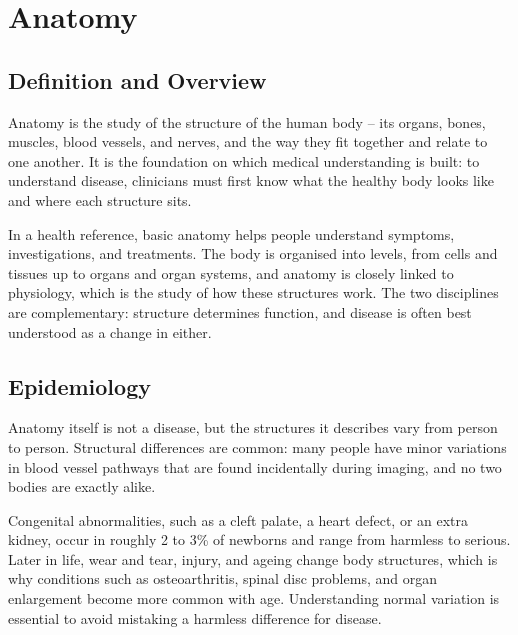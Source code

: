 \chapter{Anatomy}

\section*{Definition and Overview}
Anatomy is the study of the structure of the human body -- its organs, bones, muscles, blood vessels, and nerves, and the way they fit together and relate to one another. It is the foundation on which medical understanding is built: to understand disease, clinicians must first know what the healthy body looks like and where each structure sits.

In a health reference, basic anatomy helps people understand symptoms, investigations, and treatments. The body is organised into levels, from cells and tissues up to organs and organ systems, and anatomy is closely linked to physiology, which is the study of how these structures work. The two disciplines are complementary: structure determines function, and disease is often best understood as a change in either.

\section*{Epidemiology}
Anatomy itself is not a disease, but the structures it describes vary from person to person. Structural differences are common: many people have minor variations in blood vessel pathways that are found incidentally during imaging, and no two bodies are exactly alike.

Congenital abnormalities, such as a cleft palate, a heart defect, or an extra kidney, occur in roughly 2 to 3\% of newborns and range from harmless to serious. Later in life, wear and tear, injury, and ageing change body structures, which is why conditions such as osteoarthritis, spinal disc problems, and organ enlargement become more common with age. Understanding normal variation is essential to avoid mistaking a harmless difference for disease.


